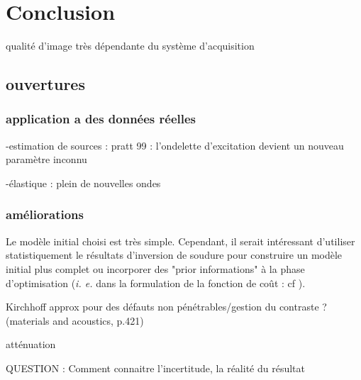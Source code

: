 \chapter{Conclusion}



qualité d'image très dépendante du système d'acquisition

\section{ouvertures}

\subsection{application a des données réelles}
-estimation de sources : pratt 99 : l'ondelette d'excitation devient un nouveau paramètre inconnu 

-élastique : plein de nouvelles ondes 


\subsection{améliorations}
Le modèle initial choisi est très simple. Cependant, il serait intéressant d'utiliser statistiquement le résultats d'inversion de soudure pour construire un modèle initial plus complet ou incorporer des "prior informations" à la phase d'optimisation (\emph{i. e.} dans la formulation de la fonction de coût : cf \cite{asnaashari}).

Kirchhoff approx pour des défauts non pénétrables/gestion du contraste ? (materials and acoustics, p.421)

atténuation

QUESTION : 
Comment connaitre l'incertitude, la réalité du résultat

